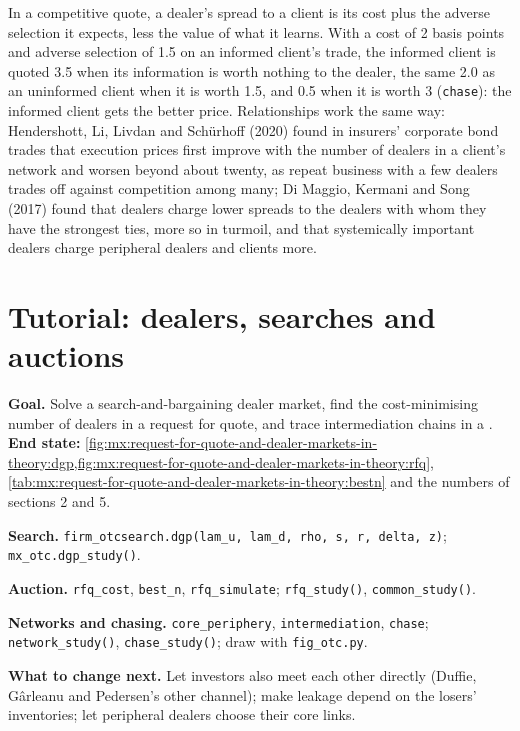 In a competitive quote, a dealer's spread to a client is its cost plus the adverse selection it expects, less the value of what it learns. With a
cost of 2 basis points and adverse selection of 1.5 on an informed client's trade, the informed client is quoted 3.5 when its information is worth
nothing to the dealer, the same 2.0 as an uninformed client when it is worth 1.5, and 0.5 when it is worth 3 (\texttt{chase}): the informed client
gets the better price. Relationships work the same way: Hendershott, Li, Livdan and Schürhoff (2020) found in insurers' corporate bond trades that
execution prices first improve with the number of dealers in a client's network and worsen beyond about twenty, as repeat business with a few
dealers trades off against competition among many; Di Maggio, Kermani and Song (2017) found that dealers charge lower spreads to the dealers with whom
they have the strongest ties, more so in turmoil, and that systemically important dealers charge peripheral dealers and clients more.

\section{Tutorial: dealers, searches and auctions}\label{tut:mx:request-for-quote-and-dealer-markets-in-theory:tut}

\begin{tutorial}
\textbf{Goal.} Solve a search-and-bargaining dealer market, find the cost-minimising number of dealers in a request for quote, and trace
intermediation chains in a .
\textbf{End state:} \cref{fig:mx:request-for-quote-and-dealer-markets-in-theory:dgp,fig:mx:request-for-quote-and-dealer-markets-in-theory:rfq},
\cref{tab:mx:request-for-quote-and-dealer-markets-in-theory:bestn} and the numbers of sections 2 and 5.
\begin{tutsteps}
\item \textbf{Search.} \texttt{firm\_otcsearch.dgp(lam\_u, lam\_d, rho, s, r, delta, z)}; \texttt{mx\_otc.dgp\_study()}.
\item \textbf{Auction.} \texttt{rfq\_cost}, \texttt{best\_n}, \texttt{rfq\_simulate}; \texttt{rfq\_study()}, \texttt{common\_study()}.
\item \textbf{Networks and chasing.} \texttt{core\_periphery}, \texttt{intermediation}, \texttt{chase}; \texttt{network\_study()},
\texttt{chase\_study()}; draw with \texttt{fig\_otc.py}.
\end{tutsteps}
\textbf{What to change next.} Let investors also meet each other directly (Duffie, Gârleanu and Pedersen's other channel); make leakage depend on
the losers' inventories; let peripheral dealers choose their core links.
\end{tutorial}

